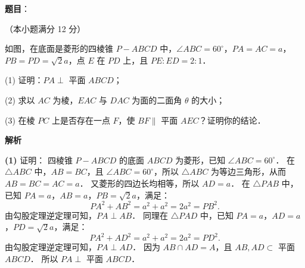 \begin{answer}

\textbf{题目}：

（本小题满分 12 分）

如图，在底面是菱形的四棱锥 $P - ABCD$ 中，$\angle ABC = 60^\circ$，$PA = AC = a$，$PB = PD = \sqrt{2}a$，点 $E$ 在 $PD$ 上，且 $PE : ED = 2 : 1$．
\nopagebreak[4]
\begin{center}\end{center}
\nopagebreak[4]
(1) 证明：$PA \perp$ 平面 $ABCD$；

(2) 求以 $AC$ 为棱，$EAC$ 与 $DAC$ 为面的二面角 $\theta$ 的大小；

(3) 在棱 $PC$ 上是否存在一点 $F$，使 $BF \parallel$ 平面 $AEC$？证明你的结论．

\textbf{解析}
\nopagebreak[4]
\begin{center}\end{center}
\nopagebreak[4]
\textbf{(1)} 证明：
四棱锥 $P - ABCD$ 的底面 $ABCD$ 为菱形，已知 $\angle ABC = 60^\circ$．
在 $\triangle ABC$ 中，$AB = BC$，且 $\angle ABC = 60^\circ$，所以 $\triangle ABC$ 为等边三角形，从而 $AB = BC = AC = a$．
又菱形的四边长均相等，所以 $AD = a$．
在 $\triangle PAB$ 中，已知 $PA = a$，$AB = a$，$PB = \sqrt{2}a$，满足：
\nopagebreak[4]
\[
PA^2 + AB^2 = a^2 + a^2 = 2a^2 = PB^2.
\]
由勾股定理逆定理可知，$PA \perp AB$．
同理在 $\triangle PAD$ 中，已知 $PA = a$，$AD = a$，$PD = \sqrt{2}a$，满足：
\nopagebreak[4]
\[
PA^2 + AD^2 = a^2 + a^2 = 2a^2 = PD^2.
\]
由勾股定理逆定理可知，$PA \perp AD$．
因为 $AB \cap AD = A$，且 $AB, AD \subset$ 平面 $ABCD$．
所以 $PA \perp$ 平面 $ABCD$．


\end{answer}
